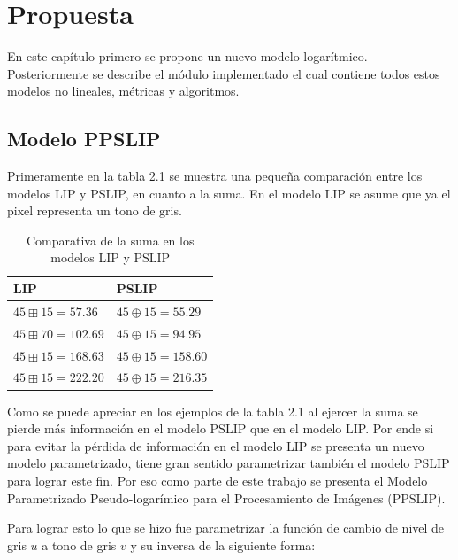 \chapter{Propuesta}\label{chapter:proposal}

En este cap\'itulo primero se propone un nuevo modelo logar\'itmico. Posteriormente se describe el m\'odulo implementado el cual contiene todos estos modelos no lineales, m\'etricas y algoritmos.

\section{Modelo PPSLIP}

Primeramente en la tabla 2.1 se muestra una peque\~na comparaci\'on entre los modelos LIP y PSLIP, en cuanto a la suma. En el modelo LIP se asume que ya el pixel representa un tono de gris.

\begin{table}
	\caption{Comparativa de la suma en los modelos LIP y PSLIP}
	\begin{center}
		\begin{tabular}{|l|l|}
			\hline 
			\textbf{LIP} & \textbf{PSLIP}\\
			\hline
			$45 \boxplus 15 = 57.36$ & $45 \oplus 15 = 55.29$\\
			\hline
			$45 \boxplus 70 = 102.69$ & $45 \oplus 15 = 94.95$\\
			\hline
			$45 \boxplus 15 = 168.63$ & $45 \oplus 15 = 158.60$\\
			\hline
			$45 \boxplus 15 = 222.20$ & $45 \oplus 15 = 216.35$\\
			\hline
		\end{tabular}
	\end{center}
\end{table}

Como se puede apreciar en los ejemplos de la tabla 2.1 al ejercer la suma se pierde m\'as informaci\'on en el modelo PSLIP que en el modelo LIP. Por ende si para evitar la p\'erdida de informaci\'on en el modelo LIP se presenta un nuevo modelo parametrizado, tiene gran sentido parametrizar tambi\'en el modelo PSLIP para lograr este fin. Por eso como parte de este trabajo se presenta el Modelo Parametrizado Pseudo-logar\'imico para el Procesamiento de Im\'agenes (PPSLIP).

Para lograr esto lo que se hizo fue parametrizar la funci\'on de cambio de nivel de gris $u$ a tono de gris $v$ y su inversa de la siguiente forma:

